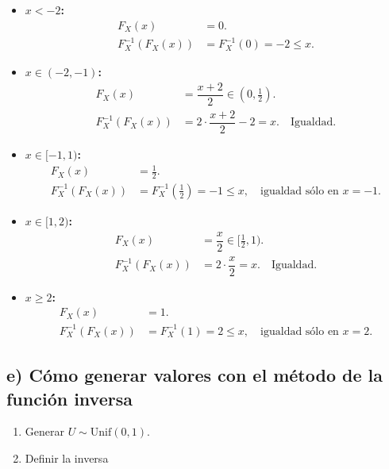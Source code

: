 \documentclass[10pt,a4paper]{article}
\let\leq\leqslant
\let\geq\geqslant
\begin{document}
    \begin{itemize}
\item
  \textbf{\(x<-2\):}\\
  \[
  \begin{align*}
  F_X(x) &= 0. \\
  F_X^{-1}(F_X(x)) &= F_X^{-1}(0) = -2 \leq x.
  \end{align*}
  \]
\item
  \textbf{\(x\in(-2,-1)\):}\\
  \[
  \begin{align*}
  F_X(x) &= \dfrac{x+2}{2} \in (0,\tfrac12). \\
  F_X^{-1}(F_X(x)) &= 2\cdot\dfrac{x+2}{2}-2 = x. \quad \text{Igualdad.}
  \end{align*}
  \]
\item
  \textbf{\(x\in[-1,1)\):}\\
  \[
  \begin{align*}
  F_X(x) &= \tfrac12. \\
  F_X^{-1}(F_X(x)) &= F_X^{-1}(\tfrac12) = -1 \leq x, \quad \text{igualdad sólo en } x=-1.
  \end{align*}
  \]
\item
  \textbf{\(x\in[1,2)\):}\\
  \[
  \begin{align*}
  F_X(x) &= \dfrac{x}{2} \in [\tfrac12,1). \\
  F_X^{-1}(F_X(x)) &= 2\cdot\dfrac{x}{2} = x. \quad \text{Igualdad.}
  \end{align*}
  \]
\item
  \textbf{\(x\geq 2\):}\\
  \[
  \begin{align*}
  F_X(x) &= 1. \\
  F_X^{-1}(F_X(x)) &= F_X^{-1}(1) = 2 \leq x, \quad \text{igualdad sólo en } x=2.
  \end{align*}
  \]
\end{itemize}

    \hypertarget{e-cuxf3mo-generar-valores-con-el-muxe9todo-de-la-funciuxf3n-inversa}{%
\subsection{e) Cómo generar valores con el método de la función
inversa}\label{e-cuxf3mo-generar-valores-con-el-muxe9todo-de-la-funciuxf3n-inversa}}

    \begin{enumerate}
\def\labelenumi{\arabic{enumi}.}
\item
  Generar \(U\sim\mathrm{Unif}(0,1)\).
\item
  Definir la inversa
\end{enumerate}
\end{document}
